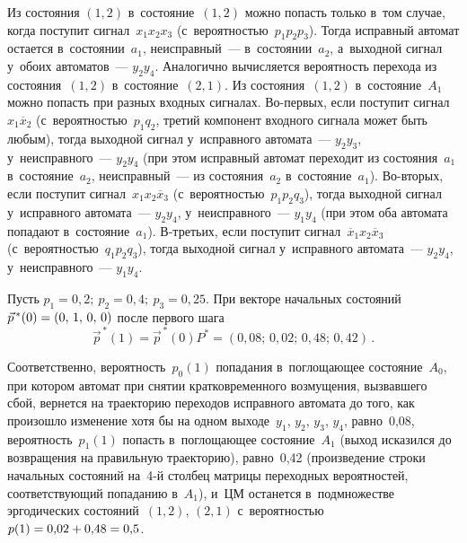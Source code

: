 \begin{multicols}{2}
    Из состояния $(1,2)$ в~состояние~$(1,2)$ можно попасть только в~том 
случае, когда поступит сигнал~$x_1x_2x_3$  
(с~ве\-ро\-ят\-ностью~$p_1p_2p_3$). Тогда исправный автомат остается  
в~со\-сто\-янии~$a_1$, неисправный~--- в~со\-сто\-янии~$a_2$, а~выходной 
сигнал у~обоих автоматов~--- $y_2y_4$. Аналогично вычисляется вероятность 
перехода из состояния~$(1,2)$ в~со\-сто\-яние~$(2,1)$. Из  
со\-сто\-яния~$(1,2)$ в~со\-сто\-яние~$A_1$ можно попасть при разных 
входных сигналах. Во-пер\-вых, если поступит сигнал~$x_1\overline{x}_2$ 
(с~ве\-ро\-ят\-ностью~$p_1q_2$, третий компонент входного сигнала может 
быть любым), тогда выходной сигнал у~исправного автомата~--- $y_2y_3$, 
у~неисправного~--- $y_2y_4$ (при этом исправный автомат переходит из  
со\-сто\-яния~$a_1$ в~со\-сто\-яние~$a_2$, неисправный~--- из  
со\-сто\-яния~$a_2$ в~со\-сто\-яние~$a_1$). Во-вто\-рых, если поступит 
сигнал~$x_1x_2\overline{x}_3$ (с~ве\-ро\-ят\-ностью~$p_1p_2q_3$), тогда 
выходной сигнал у~исправного автомата~--- $y_2y_4$, у~неисправного~--- 
$y_1y_4$ (при этом оба автомата попадают в~со\-сто\-яние~$a_1$).  
В-треть\-их, если поступит сигнал~$\overline{x}_1x_2\overline{x}_3$
    (с~ве\-ро\-ят\-ностью~$q_1p_2q_3$), тогда выходной сигнал у~исправного 
автомата~--- $y_2y_4$, у~неисправного~--- $y_1y_4$.
    
    Пусть $p_1=0{,}2;\ p_2=0{,}4;\ p_3=0{,}25.$
При векторе начальных состояний $\vec{p}^{\,*}(0)\hm= (0,\,1,\,0,\,0)$ после 
первого шага
$$
\vec{p}^{\,*}(1)= \vec{p}^{\,*}(0) P^*=\left( 0{,}08;\, 0{,}02;\, 0{,}48;\, 0{,}42\right)\,.
$$
     
     Соответственно, вероятность~$p_0(1)$ попадания в~поглощающее  
со\-сто\-яние~$A_0$, при котором автомат при снятии кратковременного 
возмущения, вызвавшего сбой, вернется на траекторию переходов исправного 
автомата до того, как произошло изменение хотя бы на одном выходе~$y_1$, 
$y_2$, $y_3$, $y_4$, равно~0,08, вероятность~$p_1(1)$ попасть в~по\-гло\-ща\-ющее  
со\-сто\-яние~$A_1$ (выход исказился до возвращения на правильную 
траекторию), равно~0,42 (произведение строки начальных со\-сто\-яний  
на~\mbox{4-й} стол\-бец мат\-ри\-цы переходных вероятностей, со\-от\-вет\-ст\-ву\-ющий 
попаданию в~$A_1$), и~ЦМ останется в~подмножестве эргодических 
состояний~$(1,2)$, $(2,1)$ с~вероятностью $p(1) \hm= 0{,}02\hm + 0{,}48\hm = 
0{,}5$.

\begin{table*}\small %
\begin{center}
\vspace*{2ex}


\end{center}
\end{table*}
\end{multicols}
